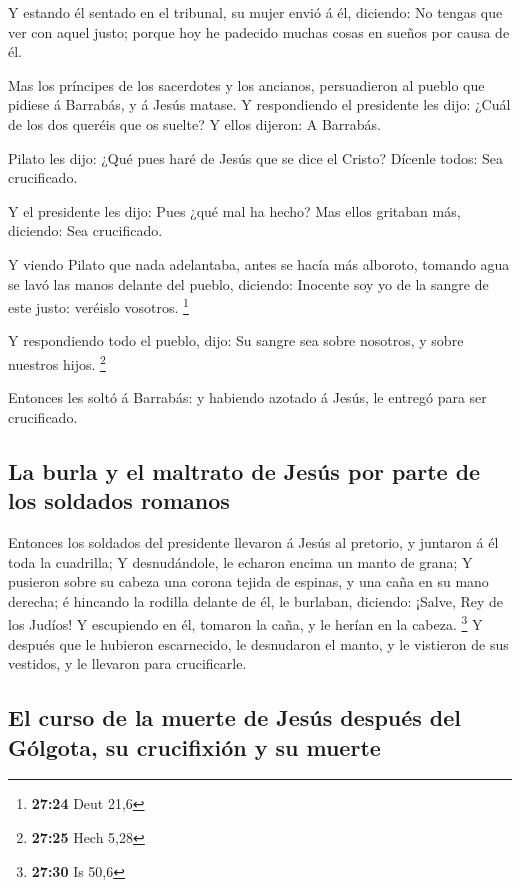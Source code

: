  Y estando él sentado en el tribunal, su mujer envió á él,
diciendo: No tengas que ver con aquel justo; porque hoy he padecido
muchas cosas en sueños por causa de él.

 Mas los príncipes de los sacerdotes y los ancianos,
persuadieron al pueblo que pidiese á Barrabás, y á Jesús matase.
 Y respondiendo el presidente les dijo: ¿Cuál de los dos
queréis que os suelte? Y ellos dijeron: A Barrabás.

 Pilato les dijo: ¿Qué pues haré de Jesús que se dice el
Cristo? Dícenle todos: Sea crucificado.

 Y el presidente les dijo: Pues ¿qué mal ha hecho? Mas
ellos gritaban más, diciendo: Sea crucificado.

 Y viendo Pilato que nada adelantaba, antes se hacía más
alboroto, tomando agua se lavó las manos delante del pueblo, diciendo:
Inocente soy yo de la sangre de este justo: veréislo vosotros.
\footnote{\textbf{27:24} Deut 21,6}

 Y respondiendo todo el pueblo, dijo: Su sangre sea sobre
nosotros, y sobre nuestros hijos. \footnote{\textbf{27:25} Hech 5,28}

 Entonces les soltó á Barrabás: y habiendo azotado á Jesús,
le entregó para ser crucificado.

\hypertarget{la-burla-y-el-maltrato-de-jesuxfas-por-parte-de-los-soldados-romanos}{%
\subsection{La burla y el maltrato de Jesús por parte de los soldados
romanos}\label{la-burla-y-el-maltrato-de-jesuxfas-por-parte-de-los-soldados-romanos}}

 Entonces los soldados del presidente llevaron á Jesús al
pretorio, y juntaron á él toda la cuadrilla;  Y
desnudándole, le echaron encima un manto de grana;  Y
pusieron sobre su cabeza una corona tejida de espinas, y una caña en su
mano derecha; é hincando la rodilla delante de él, le burlaban,
diciendo: ¡Salve, Rey de los Judíos!  Y escupiendo en él,
tomaron la caña, y le herían en la cabeza. \footnote{\textbf{27:30} Is
  50,6}  Y después que le hubieron escarnecido, le
desnudaron el manto, y le vistieron de sus vestidos, y le llevaron para
crucificarle.

\hypertarget{el-curso-de-la-muerte-de-jesuxfas-despuuxe9s-del-guxf3lgota-su-crucifixiuxf3n-y-su-muerte}{%
\subsection{El curso de la muerte de Jesús después del Gólgota, su
crucifixión y su
muerte}\label{el-curso-de-la-muerte-de-jesuxfas-despuuxe9s-del-guxf3lgota-su-crucifixiuxf3n-y-su-muerte}}

